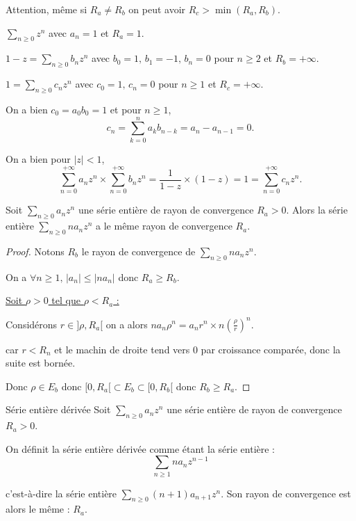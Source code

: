 \begin{remarque}
    Attention, même si $R_a \neq R_b$ on peut avoir $R_c > \min(R_a, R_b)$.
\end{remarque}

\begin{exemple}
    $\sum_{n \geqslant 0 } z^n$ avec $a_n = 1$ et $R_a = 1$.

    $1 - z = \sum_{n \geqslant 0} b_n z^n$ avec $b_0 = 1, \, b_1 = -1, \, b_n = 0$ pour $n \geqslant 2$ et $R_b = +\infty$.

    $1 = \sum_{n \geqslant 0 } c_n z^n$ avec $c_0 = 1, \, c_n = 0$ pour $n \geqslant 1$ et $R_c = +\infty$.

    On a bien $c_0 = a_0 b_0 = 1$ et pour $n \geqslant 1$, 
    \[
        c_n = \sum_{k = 0}^n a_k b_{n - k} = a_n - a_{n - 1} = 0.
    \]

    On a bien pour $|z| < 1$,
    \[
        \sum_{n = 0}^{+\infty} a_n z^n \times \sum_{n = 0}^{+ \infty} b_n z^n= \frac 1 {1 - z} \times (1 - z) = 1 = \sum_{n = 0}^{+\infty} c_n z^n.
    \]
\end{exemple}

\begin{proposition}{}{}
    Soit $\sum_{n \geqslant 0} a_n z^n$ une série entière de rayon de convergence $R_a > 0$.
    Alors la série entière $\sum_{n \geqslant 0} n a_n z^n$ a le même rayon de convergence $R_a$.
\end{proposition}

\begin{proof}
    Notons $R_b$ le rayon de convergence de $\sum_{n \geqslant 0} n a_n z^n$.

    On a $\forall n \geqslant 1, \, |a_n| \leqslant |n a_n|$ donc $R_a \geqslant R_b$.

    \uline{Soit $\rho > 0$ tel que $\rho < R_a$ :} 

    Considérons $r \in ]\rho, R_a[$ on a alors $n a_n \rho^n = a_n r^n \times n \left( \frac \rho r \right)^n$.

    car $r < R_n$ et le machin de droite tend vers 0 par croissance comparée, donc la suite est bornée. 

    Donc $\rho \in E_b$ donc $[0, R_a [ \subset E_b  \subset [0, R_b[$ donc $R_b \geqslant R_a$.
\end{proof}

\begin{definition}{Série entière dérivée}{}
    Soit $\sum_{n \geqslant 0 } a_n z^n$ une série entière de rayon de convergence $R_a > 0$.

    On définit la série entière dérivée comme étant la série entière :
    \[\sum_{n \geqslant 1} n a_n z^{ n - 1 }\]

    c'est-à-dire la série entière $\sum_{n \geqslant 0} (n + 1) a_{n + 1} z^n$. Son rayon de 
    convergence est alors le même : $R_a$. 
\end{definition}

